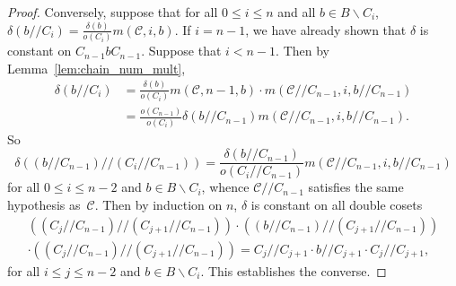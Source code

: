 \begin{proof}
Conversely, suppose that for all $0 \leq i \leq n$ and all $b \in
B\backslash C_i$, $\delta(b//C_i) =
\frac{\delta(b)}{o(C_i)}m(\mathcal{C}, i, b)$. If $i = n-1$, we have
already shown that $\delta$ is constant on $C_{n-1}bC_{n-1}$. Suppose
that $i < n-1$. Then by Lemma~\ref{lem:chain_num_mult}, 
\[
\begin{aligned}
\delta(b//C_i) &= \frac{\delta(b)}{o(C_i)}m(\mathcal{C}, n-1, b) \cdot
m(\mathcal{C}//C_{n-1}, i, b//C_{n-1})
\\
 &= \frac{o(C_{n-1})}{o(C_i)}\delta(b//C_{n-1})m(\mathcal{C}//C_{n-1},
i, b//C_{n-1}).
\end{aligned}
\]
So 
\[
\delta\left((b//C_{n-1})//(C_i//C_{n-1})\right) =
\frac{\delta(b//C_{n-1})}{o(C_i//C_{n-1})}m(\mathcal{C}//C_{n-1}, i,
b//C_{n-1})
\] 
for all $0 \leq i \leq n-2$ and $b \in B\backslash C_i$, whence
$\mathcal{C}//C_{n-1}$ satisfies the same hypothesis as~$\mathcal{C}$.
Then by induction on $n$, $\delta$ is constant on all double cosets
\begin{multline*}
\left((C_j//C_{n-1})//(C_{j+1}//C_{n-1})\right)\cdot
\left((b//C_{n-1})//(C_{j+1}//C_{n-1})\right)
\\
 \cdot
\left((C_j//C_{n-1})//(C_{j+1}//C_{n-1})\right) = C_j//C_{j+1} \cdot
b//C_{j+1}\cdot C_j//C_{j+1},
\end{multline*} 
for all $i \leq j \leq n-2$ and $b \in
B\backslash C_i$. This establishes the converse. 
 \end{proof}

